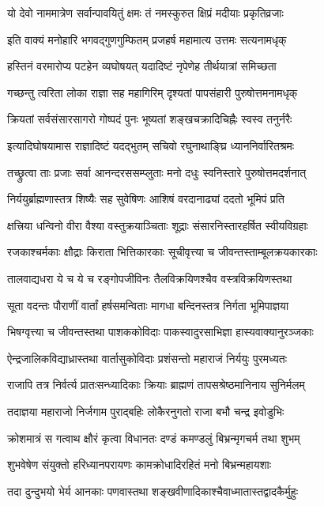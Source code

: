 \twolineshloka
{यो देवो नाममात्रेण सर्वान्पावयितुं क्षमः}
{तं नमस्कुरुत क्षिप्रं मदीयाः प्रकृतिव्रजाः}%

\twolineshloka
{इति वाक्यं मनोहारि भगवद्गुणगुम्फितम्}
{प्रजहर्ष महामात्य उत्तमः सत्यनामधृक्}%

\twolineshloka
{हस्तिनं वरमारोप्य पटहेन व्यघोषयत्}
{यदादिष्टं नृपेणेह तीर्थयात्रां समिच्छता}%

\twolineshloka
{गच्छन्तु त्वरिता लोका राज्ञा सह महागिरिम्}
{दृश्यतां पापसंहारी पुरुषोत्तमनामधृक्}%

\twolineshloka
{क्रियतां सर्वसंसारसागरो गोष्पदं पुनः}
{भूष्यतां शङ्खचक्रादिचिह्नैः स्वस्व तनुर्नरैः}%

\twolineshloka
{इत्यादिघोषयामास राज्ञादिष्टं यदद्भुतम्}
{सचिवो रघुनाथाङ्घ्रि ध्याननिर्वारितश्रमः}%

\twolineshloka
{तच्छ्रुत्वा ताः प्रजाः सर्वा आनन्दरससम्प्लुताः}
{मनो दधुः स्वनिस्तारे पुरुषोत्तमदर्शनात्}%

\twolineshloka
{निर्ययुर्ब्राह्मणास्तत्र शिष्यैः सह सुवेषिणः}
{आशिषं वरदानाढ्यां ददतो भूमिपं प्रति}%

\twolineshloka
{क्षत्त्रिया धन्विनो वीरा वैश्या वस्तुक्रयाञ्चिताः}
{शूद्राः संसारनिस्तारहर्षित स्वीयविग्रहाः}%

\twolineshloka
{रजकाश्चर्मकाः क्षौद्राः किराता भित्तिकारकाः}
{सूचीवृत्त्या च जीवन्तस्ताम्बूलक्रयकारकाः}%

\twolineshloka
{तालवाद्यधरा ये च ये च रङ्गोपजीविनः}
{तैलविक्रयिणश्चैव वस्त्रविक्रयिणस्तथा}%

\twolineshloka
{सूता वदन्तः पौराणीं वार्तां हर्षसमन्विताः}
{मागधा बन्दिनस्तत्र निर्गता भूमिपाज्ञया}%

\twolineshloka
{भिषग्वृत्त्या च जीवन्तस्तथा पाशककोविदाः}
{पाकस्वादुरसाभिज्ञा हास्यवाक्यानुरञ्जकाः}%

\twolineshloka
{ऐन्द्रजालिकविद्याध्रास्तथा वार्तासुकोविदाः}
{प्रशंसन्तो महाराजं निर्ययुः पुरमध्यतः}%

\twolineshloka
{राजापि तत्र निर्वर्त्य प्रातःसन्ध्यादिकाः क्रियाः}
{ब्राह्मणं तापसश्रेष्ठमानिनाय सुनिर्मलम्}%

\twolineshloka
{तदाज्ञया महाराजो निर्जगाम पुराद्बहिः}
{लोकैरनुगतो राजा बभौ चन्द्र इवोडुभिः}%

\twolineshloka
{क्रोशमात्रं स गत्वाथ क्षौरं कृत्वा विधानतः}
{दण्डं कमण्डलुं बिभ्रन्मृगचर्म तथा शुभम्}%

\twolineshloka
{शुभवेषेण संयुक्तो हरिध्यानपरायणः}
{कामक्रोधादिरहितं मनो बिभ्रन्महायशाः}%

\twolineshloka
{तदा दुन्दुभयो भेर्य आनकाः पणवास्तथा}
{शङ्खवीणादिकाश्चैवाध्मातास्तद्वादकैर्मुहुः}%

